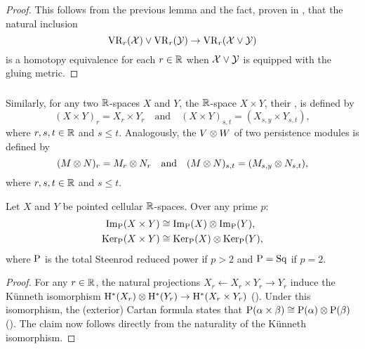 \begin{proof}
	This follows from the previous lemma and the fact, proven in \cite[Prop.~1]{adamaszek2020homotopy}, that the natural inclusion
	\[
	\mathrm{VR}_r(\mathcal{X}) \vee \mathrm{VR}_r(\mathcal{Y}) \to \mathrm{VR}_r(\mathcal{X} \vee \mathcal{Y})
	\]
	is a homotopy equivalence for each $r \in \mathbb{R}$ when \(\mathcal{X} \vee \mathcal{Y}\) is equipped with the gluing metric.
\end{proof}

\subsubsection{}

Similarly, for any two $\mathbb{R}$-spaces $X$ and $Y$, the $\mathbb{R}$-space $X \times Y$, their , is defined by
\[
(X \times Y)_r = X_r \times Y_r \quad\text{and}\quad (X \times Y)_{s,t} = (X_{s,y} \times Y_{s,t}),
\]
where \(r, s, t \in \mathbb{R}\) and \(s \leq t\).
Analogously, the  \(V \otimes W\) of two persistence modules is defined by
\[
(M \otimes N)_r = M_r \otimes N_r \quad\text{and}\quad (M \otimes N)_{s,t} = (M_{s,y} \otimes N_{s,t}),
\]
where \(r, s, t \in \mathbb{R}\) and \(s \leq t\).

\lemma
Let $X$ and $Y$ be pointed cellular $\mathbb{R}$-spaces.
Over any prime \(p\):
\begin{align*}
	\operatorname{Im}_{\mathrm{P}}(X \times Y) &\cong \operatorname{Im}_{\mathrm{P}}(X) \otimes \operatorname{Im}_{\mathrm{P}}(Y),\\
	\operatorname{Ker}_{\mathrm{P}}(X \times Y) &\cong \operatorname{Ker}_{\mathrm{P}}(X) \otimes \operatorname{Ker}_{\mathrm{P}}(Y),
\end{align*}
where \(\mathrm{P}\) is the total Steenrod reduced power if \(p > 2\) and \(\mathrm{P} = \mathrm{Sq}\) if \(p = 2\).

\begin{proof}
	For any \(r \in \mathbb{R}\), the natural projections $X_r \leftarrow X_r \times Y_r \to Y_r$ induce the K\"unneth isomorphism $\mathrm{H}^*(X_r) \otimes \mathrm{H}^*(Y_r) \to \mathrm{H}^*(X_r \times Y_r)$ (\cite[Cor.~3B.7.]{hatcher2000}).
	Under this isomorphism, the (exterior) Cartan formula states that \(\mathrm{P}(\alpha \times \beta) \cong \mathrm{P}(\alpha) \otimes \mathrm{P}(\beta)\) (\cite[Cor.~2.7]{may1970general}).
	The claim now follows directly from the naturality of the K\"unneth isomorphism.
\end{proof}

